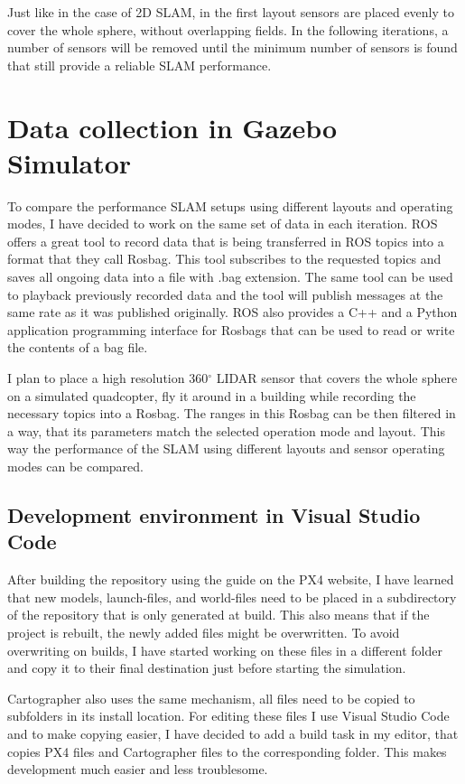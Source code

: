 Just like in the case of 2D SLAM, in the first layout sensors are placed evenly to cover the whole sphere,
without overlapping fields. In the following iterations, a number of sensors will be removed until the
minimum number of sensors is found that still provide a reliable SLAM performance.



\section{Data collection in Gazebo Simulator}
To compare the performance SLAM setups using different layouts and operating modes, I have decided to
work on the same set of data in each iteration. ROS offers a great tool to record data that is being
transferred in ROS topics into a format that they call Rosbag. This tool subscribes to the requested
topics and saves all ongoing data into a file with .bag extension. The same tool can be used to playback
previously recorded data and the tool will publish messages at the same rate as it was
published originally. ROS also provides a C++ and a Python application programming interface for Rosbags
that can be used to read or write the contents of a bag file.

I plan to place a high resolution 360$^{\circ}$ LIDAR sensor that covers the whole sphere
on a simulated quadcopter, fly it around in a building while recording the necessary topics into a Rosbag.
The ranges in this Rosbag can be then filtered in a way, that its parameters match the selected operation
mode and layout. This way the performance of the SLAM using different layouts and sensor operating modes
can be compared.



\subsection{Development environment in Visual Studio Code}
After building the repository using the guide on the PX4 website, I have learned that new models, launch-files,
and world-files need to be placed in a subdirectory of the repository that is only generated at build. This
also means that if the project is rebuilt, the newly added files might be overwritten. To avoid overwriting
on builds, I have started working on these files in a different folder and copy it to their final destination
just before starting the simulation.

Cartographer also uses the same mechanism, all files need to be copied to subfolders in its install
location. For editing these files I use Visual Studio Code and to make copying easier, I have decided
to add a build task in my editor, that copies PX4 files and Cartographer files to the corresponding folder.
This makes development much easier and less troublesome.

